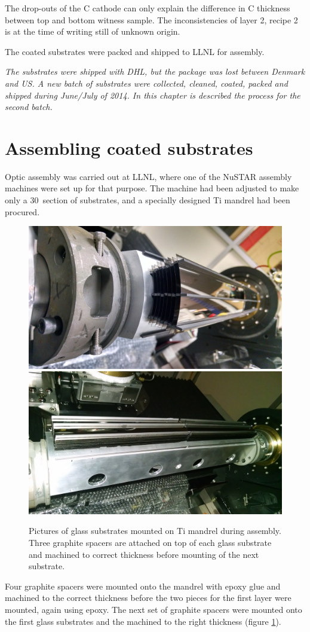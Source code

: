 The drop-outs of the C cathode can only explain the difference in C thickness between top and bottom witness sample. The inconsistencies of layer 2, recipe 2 is at the time of writing still of unknown origin.

The coated substrates were packed and shipped to LLNL for assembly.

\emph{The substrates were shipped with DHL, but the package was lost between Denmark and US. A new batch of substrates were collected, cleaned, coated, packed and shipped during June/July of 2014. In this chapter is described the process for the second batch.}

\section{Assembling coated substrates}
Optic assembly was carried out at LLNL, where one of the NuSTAR assembly machines were set up for that purpose. The machine had been adjusted to make only a 30\degr\ section of substrates, and a specially designed Ti mandrel had been procured.

\begin{figure}[htbp]
  \centering
  \includegraphics[width=0.45\linewidth]{figures/cast/assembly1.jpg}
  \includegraphics[width=0.45\linewidth]{figures/cast/assembly2.jpg}
  \caption{\footnotesize Pictures of glass substrates mounted on Ti mandrel during assembly. Three graphite spacers are attached on top of each glass substrate and machined to correct thickness before mounting of the next substrate.}
  \label{fig:cast_assembly}
\end{figure}

Four graphite spacers were mounted onto the mandrel with epoxy glue and machined to the correct thickness before the two pieces for the first layer were mounted, again using epoxy. The next set of graphite spacers were mounted onto the first glass substrates and the machined to the right thickness (figure \ref{fig:cast_assembly}).

